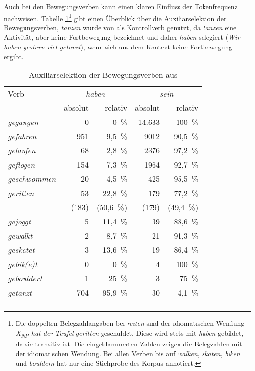 Auch bei den Bewegungsverben kann \textcite[265--268]{Gillmann.2016} einen klaren Einfluss der Tokenfrequenz nachweisen. Tabelle \ref{melitta1}\footnote{Die doppelten Belegzahlangaben bei \textit{reiten} sind der idiomatischen Wendung \textit{X\textsubscript{NP} hat der Teufel geritten} geschuldet. Diese wird stets mit \textit{haben} gebildet, da sie transitiv ist. Die eingeklammerten Zahlen zeigen die Belegzahlen mit der idiomatischen Wendung. Bei allen Verben bis auf \textit{walken}, \textit{skaten}, \textit{biken} und \textit{bouldern} hat \textcite[266]{Gillmann.2016} nur eine Stichprobe des Korpus annotiert.} gibt einen Überblick über die Auxiliarselektion der Bewegungsverben, \textit{tanzen} wurde von \textcite[265--268]{Gillmann.2016} als Kontrollverb genutzt, da \textit{tanzen} eine Aktivität, aber keine Fortbewegung bezeichnet und daher \textit{haben} selegiert (\textit{Wir haben gestern viel getanzt}), wenn sich aus dem Kontext keine Fortbewegung ergibt.\largerpage

\begin{table}
\begin{tabular}{l *4{r}}
\lsptoprule
Verb & \multicolumn{2}{c}{\textit{haben}} & \multicolumn{2}{c}{\textit{sein}}\\\cmidrule(lr){2-3}\cmidrule(lr){4-5}
& absolut & relativ & absolut & relativ\\\midrule
\textit{gegangen}   &   0 & 0\phantom{,0}~\% & 14.633 & 100\phantom{,0}~\% \\
\textit{gefahren}   &   951 & 9,5~\% & 9012 & 90,5~\% \\
\textit{gelaufen}   &    68 & 2,8~\% & 2376 & 97,2~\% \\
\textit{geflogen}   &   154 & 7,3~\% & 1964 & 92,7~\% \\
\textit{geschwommen} & 20 & 4,5~\% & 425 & 95,5~\% \\
\textit{geritten}   &  53  & 22,8~\% &  179 & 77,2~\% \\
                    & (183) & (50,6~\%) & (179) & (49,4~\%) \\                     
\textit{gejoggt}  & 5 & 11,4~\% & 39 & 88,6~\% \\
\textit{gewalkt}  &  2 & 8,7~\% & 21 & 91,3~\% \\
\textit{geskatet} & 3 & 13,6~\% & 19 & 86,4~\% \\
\textit{gebik(e)t} &  0 & 0\phantom{,0}~\% & 4 & 100\phantom{,0}~\% \\
\textit{gebouldert} & 1 & 25\phantom{,0}~\% & 3 & 75\phantom{,0}~\% \\
\midrule
\textit{getanzt} & 704 & 95,9~\% & 30 & 4,1~\% \\
\lspbottomrule
\end{tabular}
\caption{Auxiliarselektion der Bewegungsverben aus \textcite[267]{Gillmann.2016}\label{melitta1}}
\end{table}

